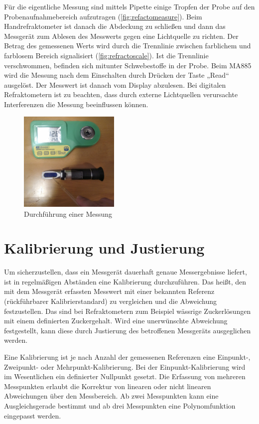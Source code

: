 \documentclass[a4paper,parskip=half]{scrartcl}
\begin{document}
Für die eigentliche Messung sind mittels Pipette einige Tropfen
der Probe auf den Probenaufnahmebereich aufzutragen
(\autoref{fig:refactomeasure}). Beim Handrefraktometer
ist danach die Abdeckung zu schließen und dann das Messgerät
zum Ablesen des Messwerts gegen eine Lichtquelle zu richten.
Der Betrag des gemessenen Werts wird durch die Trennlinie zwischen
farblichem und farblosem Bereich signalisiert (\autoref{fig:refractoscale}).
Ist die Trennlinie verschwommen, befinden sich mitunter Schwebestoffe
in der Probe. Beim MA885 wird die Messung nach
dem Einschalten durch Drücken der Taste „Read“ ausgelöst. Der
Messwert ist danach vom Display abzulesen. Bei digitalen
Refraktometern ist zu beachten, dass durch externe Lichtquellen
verursachte Interferenzen die Messung beeinflussen können.
\autocite{Gossett2012a,Terrill2013}

\begin{figure}[h]
\centering
\includegraphics[width=4.8cm]{images/measure.jpg}
\caption{Durchführung einer Messung}
\label{fig:refactomeasure}
\end{figure}

\section*{Kalibrierung und Justierung}

Um sicherzustellen, dass ein Messgerät dauerhaft genaue Messergebnisse
liefert, ist in regelmäßigen Abständen eine Kalibrierung durchzuführen.
Das heißt, den mit dem Messgerät erfassten Messwert mit einer bekannten
Referenz (rückführbarer Kalibrierstandard) zu vergleichen und die
Abweichung festzustellen. Das sind bei Refraktometern zum Beispiel
wässrige Zuckerlösungen mit einem definierten Zuckergehalt.
Wird eine unerwünschte Abweichung festgestellt, kann diese
durch Justierung des betroffenen Messgeräts ausgeglichen werden.

Eine Kalibrierung ist je nach Anzahl der gemessenen Referenzen
eine Einpunkt-, Zweipunkt- oder Mehrpunkt-Kalibrierung.
Bei der Einpunkt-Kalibrierung wird im Wesentlichen ein definierter
Nullpunkt gesetzt. Die Erfassung von mehreren Messpunkten erlaubt
die Korrektur von linearen oder nicht linearen Abweichungen
über den Messbereich. Ab zwei Messpunkten kann eine Ausgleichsgerade
bestimmt und ab drei Messpunkten eine Polynomfunktion eingepasst
werden. \autocite{Earl2015}
\end{document}
